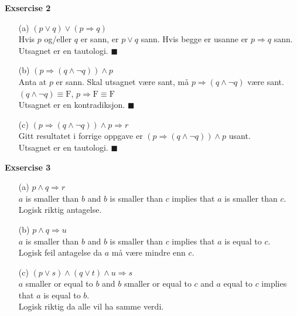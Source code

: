 \documentclass[a4paper, 12pt]{article}  %
\begin{document}
\newpage
\textbf{Exsercise 2}
\begin{enumerate}
    \item [(a)] $(p \lor q) \lor (p \Rightarrow q)$
    \\Hvis $p$ og/eller $q$ er sann, er $p \lor q$ sann. Hvis begge er usanne er $p \Rightarrow q$ sann.
    \\Utsagnet er en tautologi. $\blacksquare$

    \item [(b)] $\left( p \Rightarrow (q \land \neg q) \right) \land p$
    \\Anta at $p$ er sann. Skal utsagnet være sant, må $p \Rightarrow (q \land \neg q)$ være sant.
    \\ $(q \land \neg q) \equiv \mathrm{F}$, $p \Rightarrow \mathrm{F} \equiv \mathrm{F}$
    \\Utsagnet er en kontradiksjon. $\blacksquare$

    \item [(c)] $\left( p \Rightarrow (q \land \neg q) \right) \land p \Rightarrow r$
    \\Gitt resultatet i forrige oppgave er $\left( p \Rightarrow (q \land \neg q) \right) \land p$ usant.
    \\Utsagnet er en tautologi. $\blacksquare$
\end{enumerate}

\textbf{Exsercise 3}
\begin{enumerate}
    \item [(a)] $p \land q \Rightarrow r$
    \\$a$ is smaller than $b$ and $b$ is smaller than $c$ implies that $a$ is smaller than $c$.
    \\Logisk riktig antagelse.
    \item [(b)] $p \land q \Rightarrow u$
    \\$a$ is smaller than $b$ and $b$ is smaller than $c$ implies that $a$ is equal to $c$.
    \\Logisk feil antagelse da $a$ må være mindre enn $c$.
    \item [(c)] $(p \lor s) \land (q \lor t) \land u \Rightarrow s$
    \\$a$ smaller or equal to $b$ and $b$ smaller or equal to $c$ and $a$ equal to $c$ implies that $a$ is equal to $b$.
    \\Logisk riktig da alle vil ha samme verdi.
\end{enumerate}
\end{document}
